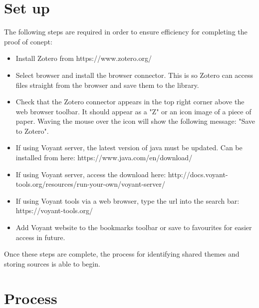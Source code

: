 \documentclass{article}
\begin{document}
\section{Set up}
The following steps are required in order to ensure efficiency for completing the proof of conept:
\begin{itemize}
    \item Install Zotero from https://www.zotero.org/
    \item Select browser and install the browser connector. This is so Zotero can access files straight from the browser and save them to the library.
    \item Check that the Zotero connector appears in the top right corner above the web browser toolbar. It should appear as a "Z" or an icon image of a piece of paper. Waving the mouse over the icon will show the following message: "Save to Zotero". 
    \item If using Voyant server, the latest version of java must be updated. Can be installed from here: https://www.java.com/en/download/
    \item If using Voyant server, access the download here: http://docs.voyant-tools.org/resources/run-your-own/voyant-server/
    \item If using Voyant tools via a web browser, type the url into the search bar: https://voyant-tools.org/
    \item Add Voyant website to the bookmarks toolbar or save to favourites for easier access in future.
\end{itemize}
Once these steps are complete, the process for identifying shared themes and storing sources is able to begin. 

\section{Process}
\end{document}
